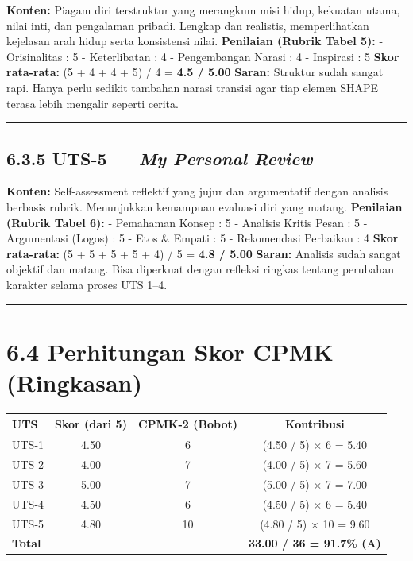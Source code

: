 \documentclass[
  letterpaper,
  DIV=11,
  numbers=noendperiod]{scrreprt}
\begin{document}
\textbf{Konten:} Piagam diri terstruktur yang merangkum misi hidup,
kekuatan utama, nilai inti, dan pengalaman pribadi. Lengkap dan
realistis, memperlihatkan kejelasan arah hidup serta konsistensi nilai.
\textbf{Penilaian (Rubrik Tabel 5):} - Orisinalitas : 5 - Keterlibatan :
4 - Pengembangan Narasi : 4 - Inspirasi : 5 \textbf{Skor rata-rata:} (5
+ 4 + 4 + 5) / 4 = \textbf{4.5 / 5.00} \textbf{Saran:} Struktur sudah
sangat rapi. Hanya perlu sedikit tambahan narasi transisi agar tiap
elemen SHAPE terasa lebih mengalir seperti cerita.

\begin{center}\rule{0.5\linewidth}{0.5pt}\end{center}

\subsection{\texorpdfstring{6.3.5 UTS-5 --- \emph{My Personal
Review}}{6.3.5 UTS-5 --- My Personal Review}}\label{uts-5-my-personal-review}

\textbf{Konten:} Self-assessment reflektif yang jujur dan argumentatif
dengan analisis berbasis rubrik. Menunjukkan kemampuan evaluasi diri
yang matang. \textbf{Penilaian (Rubrik Tabel 6):} - Pemahaman Konsep : 5
- Analisis Kritis Pesan : 5 - Argumentasi (Logos) : 5 - Etos \& Empati :
5 - Rekomendasi Perbaikan : 4 \textbf{Skor rata-rata:} (5 + 5 + 5 + 5 +
4) / 5 = \textbf{4.8 / 5.00} \textbf{Saran:} Analisis sudah sangat
objektif dan matang. Bisa diperkuat dengan refleksi ringkas tentang
perubahan karakter selama proses UTS 1--4.

\begin{center}\rule{0.5\linewidth}{0.5pt}\end{center}

\section{6.4 Perhitungan Skor CPMK
(Ringkasan)}\label{perhitungan-skor-cpmk-ringkasan}

\begin{longtable}[]{@{}lccc@{}}
\toprule\noalign{}
UTS & Skor (dari 5) & CPMK-2 (Bobot) & Kontribusi \\
\midrule\noalign{}
\endhead
\bottomrule\noalign{}
\endlastfoot
UTS-1 & 4.50 & 6 & (4.50 / 5) × 6 = 5.40 \\
UTS-2 & 4.00 & 7 & (4.00 / 5) × 7 = 5.60 \\
UTS-3 & 5.00 & 7 & (5.00 / 5) × 7 = 7.00 \\
UTS-4 & 4.50 & 6 & (4.50 / 5) × 6 = 5.40 \\
UTS-5 & 4.80 & 10 & (4.80 / 5) × 10 = 9.60 \\
\textbf{Total} & & & \textbf{33.00 / 36 = 91.7\% (A)} \\
\end{longtable}
\end{document}
